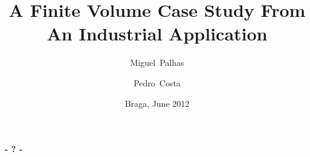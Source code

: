 \documentclass{beamer}
\title[A Finite Volume Case Study]{A Finite Volume Case Study From An Industrial Application}
\author[M. Palhas \and P. Costa]{Miguel~Palhas \and Pedro~Costa}
\institute[19808 \and 19830]{
	Department of Informatics\\
	University of Minho
}
\date{Braga, June 2012}
\begin{document}

\frame[plain]{\titlepage}










\begin{frame}[plain]
	\titlepage
	\begin{center}
		\Huge\bfseries - ? -
	\end{center}
\end{frame}
\end{document}
